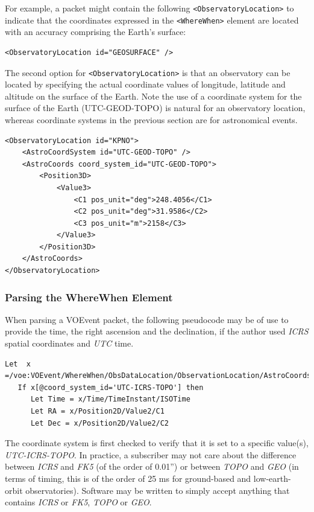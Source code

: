 \documentclass[11pt,a4paper]{ivoa}
\begin{document}
For example, a packet might contain the following {\tt <ObservatoryLocation>} to indicate that the coordinates expressed in the {\tt <WhereWhen>} element are located with an accuracy comprising the Earth's surface: 
{\footnotesize
\begin{verbatim}
<ObservatoryLocation id="GEOSURFACE" /> 
\end{verbatim}}

The second option for {\tt <ObservatoryLocation>} is that an observatory can be located by specifying the actual coordinate values of longitude, latitude and altitude on the surface of the Earth. Note the use of a coordinate system for the surface of the Earth (UTC-GEOD-TOPO) is natural for an observatory location, whereas coordinate systems in the previous section are for astronomical events. 
{\footnotesize
\begin{verbatim}
<ObservatoryLocation id="KPNO">
    <AstroCoordSystem id="UTC-GEOD-TOPO" />
    <AstroCoords coord_system_id="UTC-GEOD-TOPO">
        <Position3D>
            <Value3>
                <C1 pos_unit="deg">248.4056</C1>
                <C2 pos_unit="deg">31.9586</C2>
                <C3 pos_unit="m">2158</C3>
            </Value3>
        </Position3D>
    </AstroCoords>
</ObservatoryLocation> 
\end{verbatim}}

\subsubsection{Parsing the WhereWhen Element}
\label{sec:3.4.3}
When parsing a VOEvent packet, the following pseudocode may be of use to provide the time, the right ascension and the declination, if the author used \emph{ICRS} spatial coordinates and \emph{UTC} time. 
{\footnotesize
\begin{verbatim}
Let  x =/voe:VOEvent/WhereWhen/ObsDataLocation/ObservationLocation/AstroCoords
   If x[@coord_system_id='UTC-ICRS-TOPO'] then
      Let Time = x/Time/TimeInstant/ISOTime
      Let RA = x/Position2D/Value2/C1
      Let Dec = x/Position2D/Value2/C2 
\end{verbatim}}

The coordinate system is first checked to verify that it is set to a specific value(s), \emph{UTC-ICRS-TOPO}. In practice, a subscriber may not care about the difference between \emph{ICRS} and \emph{FK5} (of the order of 0.01'') or between \emph{TOPO} and \emph{GEO} (in terms of timing, this is of the order of 25 ms for ground-based and low-earth-orbit observatories). Software may be written to simply accept anything that contains \emph{ICRS} or \emph{FK5}, \emph{TOPO} or \emph{GEO}. 
\end{document}
